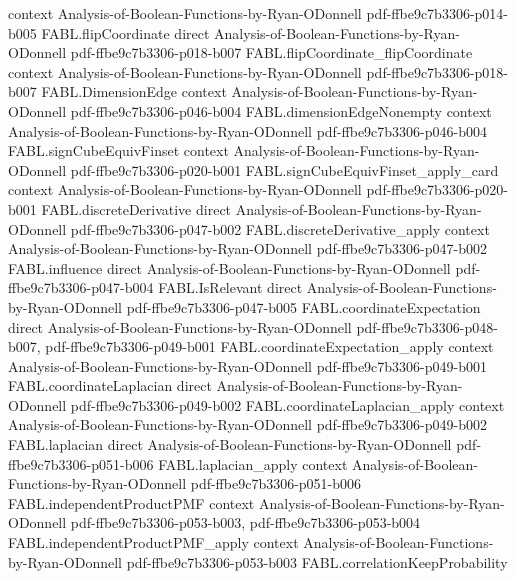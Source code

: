 \begin{theorem}
  {context}
  {Analysis-of-Boolean-Functions-by-Ryan-ODonnell}
  {pdf-ffbe9c7b3306-p014-b005}
\proofstep
  {FABL.flipCoordinate}
  {direct}
  {Analysis-of-Boolean-Functions-by-Ryan-ODonnell}
  {pdf-ffbe9c7b3306-p018-b007}
\proofstep
  {FABL.flipCoordinate_flipCoordinate}
  {context}
  {Analysis-of-Boolean-Functions-by-Ryan-ODonnell}
  {pdf-ffbe9c7b3306-p018-b007}
\proofstep
  {FABL.DimensionEdge}
  {context}
  {Analysis-of-Boolean-Functions-by-Ryan-ODonnell}
  {pdf-ffbe9c7b3306-p046-b004}
\proofstep
  {FABL.dimensionEdgeNonempty}
  {context}
  {Analysis-of-Boolean-Functions-by-Ryan-ODonnell}
  {pdf-ffbe9c7b3306-p046-b004}
\proofstep
  {FABL.signCubeEquivFinset}
  {context}
  {Analysis-of-Boolean-Functions-by-Ryan-ODonnell}
  {pdf-ffbe9c7b3306-p020-b001}
\proofstep
  {FABL.signCubeEquivFinset_apply_card}
  {context}
  {Analysis-of-Boolean-Functions-by-Ryan-ODonnell}
  {pdf-ffbe9c7b3306-p020-b001}
\proofstep
  {FABL.discreteDerivative}
  {direct}
  {Analysis-of-Boolean-Functions-by-Ryan-ODonnell}
  {pdf-ffbe9c7b3306-p047-b002}
\proofstep
  {FABL.discreteDerivative_apply}
  {context}
  {Analysis-of-Boolean-Functions-by-Ryan-ODonnell}
  {pdf-ffbe9c7b3306-p047-b002}
\proofstep
  {FABL.influence}
  {direct}
  {Analysis-of-Boolean-Functions-by-Ryan-ODonnell}
  {pdf-ffbe9c7b3306-p047-b004}
\proofstep
  {FABL.IsRelevant}
  {direct}
  {Analysis-of-Boolean-Functions-by-Ryan-ODonnell}
  {pdf-ffbe9c7b3306-p047-b005}
\proofstep
  {FABL.coordinateExpectation}
  {direct}
  {Analysis-of-Boolean-Functions-by-Ryan-ODonnell}
  {pdf-ffbe9c7b3306-p048-b007,
    pdf-ffbe9c7b3306-p049-b001}
\proofstep
  {FABL.coordinateExpectation_apply}
  {context}
  {Analysis-of-Boolean-Functions-by-Ryan-ODonnell}
  {pdf-ffbe9c7b3306-p049-b001}
\proofstep
  {FABL.coordinateLaplacian}
  {direct}
  {Analysis-of-Boolean-Functions-by-Ryan-ODonnell}
  {pdf-ffbe9c7b3306-p049-b002}
\proofstep
  {FABL.coordinateLaplacian_apply}
  {context}
  {Analysis-of-Boolean-Functions-by-Ryan-ODonnell}
  {pdf-ffbe9c7b3306-p049-b002}
\proofstep
  {FABL.laplacian}
  {direct}
  {Analysis-of-Boolean-Functions-by-Ryan-ODonnell}
  {pdf-ffbe9c7b3306-p051-b006}
\proofstep
  {FABL.laplacian_apply}
  {context}
  {Analysis-of-Boolean-Functions-by-Ryan-ODonnell}
  {pdf-ffbe9c7b3306-p051-b006}
\proofstep
  {FABL.independentProductPMF}
  {context}
  {Analysis-of-Boolean-Functions-by-Ryan-ODonnell}
  {pdf-ffbe9c7b3306-p053-b003,
    pdf-ffbe9c7b3306-p053-b004}
\proofstep
  {FABL.independentProductPMF_apply}
  {context}
  {Analysis-of-Boolean-Functions-by-Ryan-ODonnell}
  {pdf-ffbe9c7b3306-p053-b003}
\proofstep
  {FABL.correlationKeepProbability}

\end{theorem}
